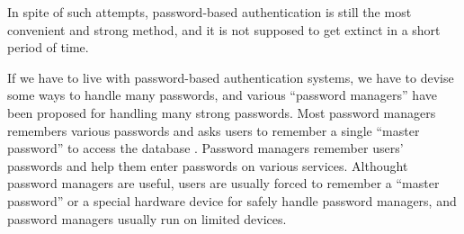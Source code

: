 \documentclass{article}
\begin{document}

In spite of such attempts,
password-based authentication is still the most
convenient and strong method\cite{Bonnearu:ReplacePasswords},
and it is not supposed to get extinct
in a short period of time\cite{Herley:2009:PSS:1601990.1602010}.



If we have to live with password-based authentication systems,
we have to devise some ways to handle many passwords, and
various ``password managers'' have been proposed
for handling many strong passwords.
%
%
Most password managers remembers various passwords and
asks users to remember a single ``master password'' to access the database
\cite{OnePassword}%
\cite{Dashlane}%
\cite{ミルパス}%
\cite{LastPass}%
\cite{KeyPass}%
\cite{NortonIDSafe}%
\cite{IDManager}.
%
%
Password managers remember users' passwords and help them enter
passwords on various services.
Althought password managers are useful,
users are usually forced to remember a ``master password''
or a special hardware device
for safely handle password managers, and
password managers usually run on limited devices.

%
\end{document}
